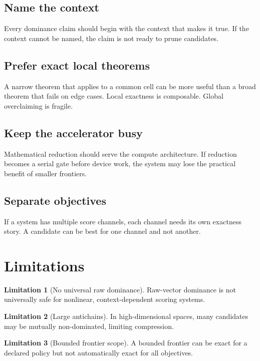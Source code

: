 \documentclass[11pt,oneside]{article}
\theoremstyle{definition}
\newtheorem{limitation}{Limitation}[section]
\begin{document}
\subsection{Name the context}
Every dominance claim should begin with the context that makes it true. If the context cannot be named, the claim is not ready to prune candidates.

\subsection{Prefer exact local theorems}
A narrow theorem that applies to a common cell can be more useful than a broad theorem that fails on edge cases. Local exactness is composable. Global overclaiming is fragile.

\subsection{Keep the accelerator busy}
Mathematical reduction should serve the compute architecture. If reduction becomes a serial gate before device work, the system may lose the practical benefit of smaller frontiers.

\subsection{Separate objectives}
If a system has multiple score channels, each channel needs its own exactness story. A candidate can be best for one channel and not another.

\section{Limitations}

\begin{limitation}[No universal raw dominance]
Raw-vector dominance is not universally safe for nonlinear, context-dependent scoring systems.
\end{limitation}

\begin{limitation}[Large antichains]
In high-dimensional spaces, many candidates may be mutually non-dominated, limiting compression.
\end{limitation}

\begin{limitation}[Bounded frontier scope]
A bounded frontier can be exact for a declared policy but not automatically exact for all objectives.
\end{limitation}
\end{document}
